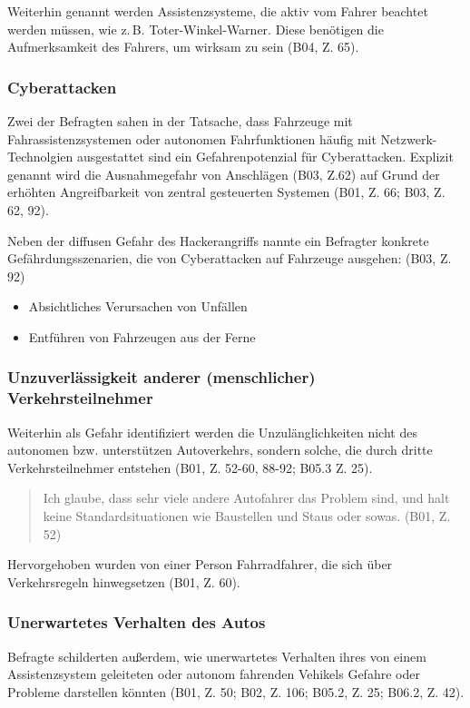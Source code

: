 \documentclass[12pt]{article}
\begin{document}
Weiterhin genannt werden Assistenzsysteme, die aktiv vom Fahrer beachtet werden müssen, wie z.\,B. Toter-Winkel-Warner. Diese benötigen die Aufmerksamkeit des Fahrers, um wirksam zu sein (B04, Z. 65).

\subsubsection*{Cyberattacken}
Zwei der Befragten sahen in der Tatsache, dass Fahrzeuge mit Fahrassistenzsystemen oder autonomen Fahrfunktionen häufig mit Netzwerk-Technolgien ausgestattet sind ein Gefahrenpotenzial für Cyberattacken. Explizit genannt wird die \glqq Ausnahmegefahr von Anschlägen\grqq{} (B03, Z.62) auf Grund der erhöhten Angreifbarkeit von zentral gesteuerten Systemen (B01, Z. 66; B03, Z. 62, 92).

Neben der diffusen Gefahr des Hackerangriffs nannte ein Befragter konkrete Gefährdungsszenarien, die von Cyberattacken auf Fahrzeuge ausgehen: (B03, Z. 92)
\begin{itemize}
  \item Absichtliches Verursachen von Unfällen
  \item Entführen von Fahrzeugen aus der Ferne
\end{itemize}

\subsubsection*{Unzuverlässigkeit anderer (menschlicher) Verkehrsteilnehmer}
Weiterhin als Gefahr identifiziert werden die Unzulänglichkeiten nicht des autonomen bzw. unterstützen Autoverkehrs, sondern solche, die durch dritte Verkehrsteilnehmer entstehen (B01, Z. 52-60, 88-92; B05.3 Z. 25).

\begin{quote}
  Ich glaube, dass sehr viele andere Autofahrer das Problem sind, und halt keine Standardsituationen wie Baustellen und Staus oder sowas. (B01, Z. 52)
\end{quote}

Hervorgehoben wurden von einer Person Fahrradfahrer, die sich über Verkehrsregeln hinwegsetzen (B01, Z. 60).

\subsubsection*{Unerwartetes Verhalten des Autos}
Befragte schilderten außerdem, wie unerwartetes Verhalten ihres von einem Assistenzsystem geleiteten oder autonom fahrenden Vehikels Gefahre oder Probleme darstellen könnten (B01, Z. 50; B02, Z. 106; B05.2, Z. 25; B06.2, Z. 42).
\end{document}

